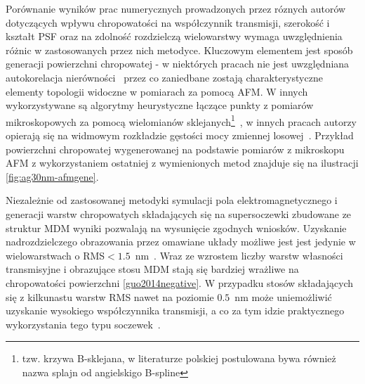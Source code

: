 Porównanie wyników prac numerycznych prowadzonych przez róznych autorów dotyczących wpływu chropowatości na współczynnik transmisji, szerokość i kształt PSF oraz na zdolność rozdzielczą wielowarstwy wymaga uwzględnienia różnic w zastosowanych przez nich metodyce. Kluczowym elementem jest sposób generacji powierzchni chropowatej - w niektórych pracach nie jest uwzględniana autokorelacja nierówności~\cite{guo2014negative} przez co zaniedbane zostają charakterystyczne elementy topologii widoczne w pomiarach za pomocą AFM. W innych wykorzystywane są algorytmy heurystyczne łączące punkty z pomiarów mikroskopowych za pomocą wielomianów sklejanych\footnote{tzw. krzywa B-sklejana, w literaturze polskiej postulowana bywa również nazwa splajn od angielskigo B-spline}~\cite{ludwig2012impact}, w innych pracach autorzy opierają się na widmowym rozkładzie gęstości mocy zmiennej losowej~\cite{pastuszczak2013engineering}. Przykład powierzchni chropowatej wygenerowanej na podstawie pomiarów z mikroskopu AFM z wykorzystaniem ostatniej z wymienionych metod znajduje się na ilustracji \ref{fig:ag30nm-afmgene}.

Niezależnie od zastosowanej metodyki symulacji pola elektromagnetycznego i generacji warstw chropowatych składających się na supersoczewki zbudowane ze struktur MDM wyniki pozwalają na wysunięcie zgodnych wniosków. Uzyskanie nadrozdzielczego obrazowania przez omawiane układy  możliwe jest jest jedynie w wielowarstwach o RMS$<1.5$~nm~\citep{guo2014negative,stefaniuk2011effect,ludwig2012impact}. Wraz ze wzrostem liczby warstw własności transmisyjne i obrazujące stosu MDM stają się bardziej wrażliwe na chropowatości powierzchni \ref{guo2014negative}. W przypadku stosów składających się z kilkunastu warstw RMS nawet na poziomie $0.5$~nm może uniemożliwić uzyskanie wysokiego współczynnika transmisji, a co za tym idzie praktycznego wykorzystania tego typu soczewek~\cite{pastuszczak2013engineering}.








